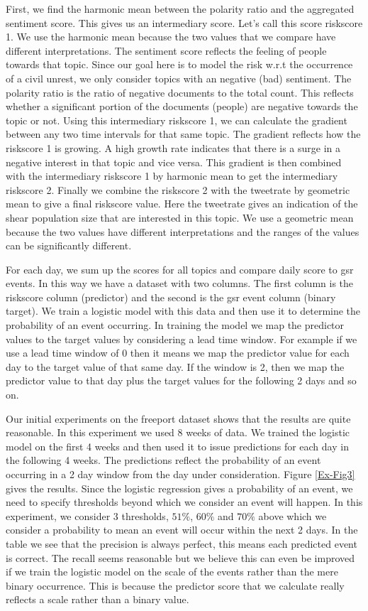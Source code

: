 \documentclass{article}
\begin{document}
First, we find the harmonic mean between the polarity ratio and the aggregated sentiment score. This gives us an intermediary score. Let's call this score riskscore 1. We use the harmonic mean because the two values that we compare have different interpretations. The sentiment score reflects the feeling of people towards that topic. Since our goal here is to model the risk w.r.t the occurrence of a civil unrest, we only consider topics with an negative (bad) sentiment. The polarity ratio is the ratio of negative documents to the total count. This reflects whether a significant portion of the documents (people) are negative towards the topic or not. Using this intermediary riskscore 1, we can calculate the gradient between any two time intervals for that same topic. The gradient reflects how the riskscore 1 is growing. A high growth rate indicates that there is a surge in a negative interest in that topic and vice versa. This gradient is then combined with the intermediary riskscore 1 by harmonic mean to get the intermediary riskscore 2.  Finally we combine the riskscore 2 with the tweetrate by geometric mean to give a final riskscore value. Here the tweetrate gives an indication of the shear population size that are interested in this topic. We use a geometric mean because the two values have different interpretations and the ranges of the values can be significantly different.

For each day, we sum up the scores for all topics and compare daily score to gsr events. In this way we have a dataset with two columns. The first column is the riskscore column (predictor) and the second is the gsr event column (binary target). We train a logistic model with this data and then use it to determine the probability of an event occurring. In training the model we map the predictor values to the target values  by considering a lead time window. For example if we use a lead time window of 0 then it means we map the predictor value for each day to the target value of that same day. If the window is 2, then we map the predictor value to that day plus the target values for the following 2 days and  so on.

Our initial experiments on the freeport dataset shows that the results are quite reasonable. In this experiment we used 8 weeks of data. We trained the logistic model on the first 4 weeks and then used it to issue predictions for each day in the following 4 weeks. The predictions reflect the probability of an event occurring in a 2 day window from the day under consideration.  Figure \ref{Ex-Fig3} gives the results. Since the logistic regression gives a probability of an event, we need to specify thresholds beyond which we consider an event will happen. In this experiment, we consider 3 thresholds, $51\%$, $60\%$ and $70\%$ above which we consider a probability to mean an event will occur within the next 2 days. In the table we see that the precision is always perfect, this means each predicted event is correct. The recall seems reasonable but we believe this can even be improved if we train the logistic model on the scale of the events rather than the mere binary occurrence. This is because the predictor score that we calculate really reflects a scale rather than a binary value.
\end{document}

